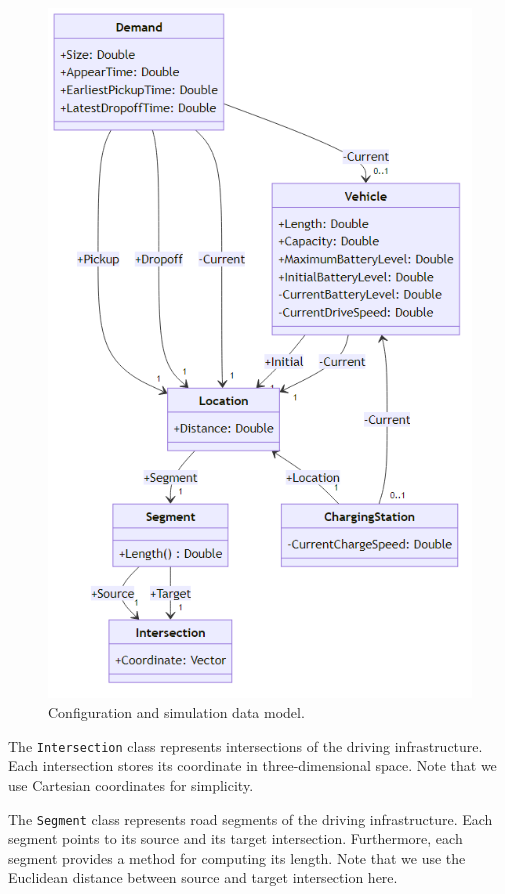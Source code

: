 \documentclass[10pt,twocolumn]{article}
\begin{document}
\begin{figure}[!ht]
    \centering
    \includegraphics[scale=0.4]{../../diagrams/model/classes-v0.2.png}
    \caption{Configuration and simulation data model.}
    \label{fig:data-model}
\end{figure}

The \texttt{Intersection} class represents intersections of the driving infrastructure.
Each intersection stores its coordinate in three-dimensional space.
Note that we use Cartesian coordinates for simplicity.

The \texttt{Segment} class represents road segments of the driving infrastructure.
Each segment points to its source and its target intersection.
Furthermore, each segment provides a method for computing its length.
Note that we use the Euclidean distance between source and target intersection here.
\end{document}
